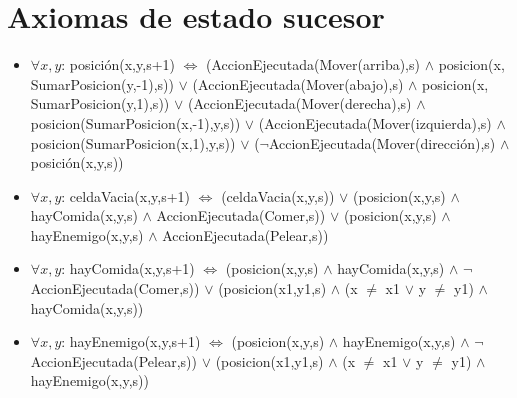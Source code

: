 \section{Axiomas de estado sucesor}

\begin{itemize}

\item $\forall x,y$: posición(x,y,s+1) $\Leftrightarrow$
\newline (AccionEjecutada(Mover(arriba),s) $\land$ posicion(x, SumarPosicion(y,-1),s))
\newline $\lor$
\newline (AccionEjecutada(Mover(abajo),s) $\land$ posicion(x, SumarPosicion(y,1),s))
\newline $\lor$
\newline (AccionEjecutada(Mover(derecha),s) $\land$ posicion(SumarPosicion(x,-1),y,s))
\newline $\lor$
\newline (AccionEjecutada(Mover(izquierda),s) $\land$ posicion(SumarPosicion(x,1),y,s))
\newline $\lor$
\newline ($\lnot$AccionEjecutada(Mover(dirección),s) $\land$ posición(x,y,s))

\item $\forall x,y$: celdaVacia(x,y,s+1) $\Leftrightarrow$
\newline (celdaVacia(x,y,s))
\newline $\lor$
\newline (posicion(x,y,s) $\land$ hayComida(x,y,s) $\land$ AccionEjecutada(Comer,s))
\newline $\lor$
\newline (posicion(x,y,s) $\land$ hayEnemigo(x,y,s) $\land$ AccionEjecutada(Pelear,s))

\item $\forall x,y$: hayComida(x,y,s+1) $\Leftrightarrow$
\newline (posicion(x,y,s) $\land$ hayComida(x,y,s) $\land$ $\lnot$AccionEjecutada(Comer,s))
\newline $\lor$
\newline (posicion(x1,y1,s) $\land$ (x $\ne$ x1 $\lor$ y $\ne$ y1) $\land$ hayComida(x,y,s))

\item $\forall x,y$: hayEnemigo(x,y,s+1) $\Leftrightarrow$
\newline (posicion(x,y,s) $\land$ hayEnemigo(x,y,s) $\land$ $\lnot$AccionEjecutada(Pelear,s))
\newline $\lor$
\newline (posicion(x1,y1,s) $\land$ (x $\ne$ x1 $\lor$ y $\ne$ y1) $\land$ hayEnemigo(x,y,s))

\end{itemize}

